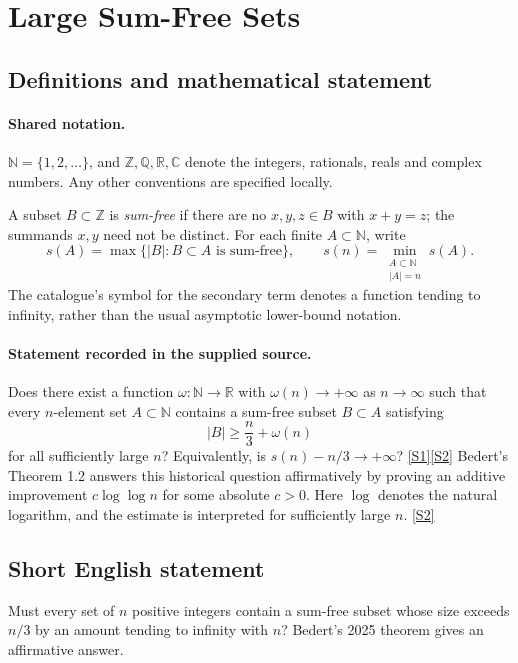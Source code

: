 \documentclass[11pt]{article}
\newcommand{\sref}[2]{\hyperlink{source:#1:#2}{[S#2]}}
\begin{document}
\section{Large Sum-Free Sets}\label{statement}

\subsection{Definitions and mathematical statement}

\paragraph{Shared notation.}$\mathbb N=\{1,2,\ldots\}$, and $\mathbb Z,\mathbb Q,\mathbb R,\mathbb C$ denote the integers, rationals, reals and complex numbers. Any other conventions are specified locally.


A subset $B\subset\mathbb Z$ is \emph{sum-free} if there are no $x,y,z\in B$ with $x+y=z$; the summands $x,y$ need not be distinct. For each finite $A\subset\mathbb N$, write
\[
s(A)=\max\{|B|:B\subset A\text{ is sum-free}\},\qquad
s(n)=\min_{\substack{A\subset\mathbb N\\|A|=n}}s(A).
\]
The catalogue's symbol for the secondary term denotes a function tending to infinity, rather than the usual asymptotic lower-bound notation.
\paragraph{Statement recorded in the supplied source.}
Does there exist a function $\omega:\mathbb N\to\mathbb R$ with $\omega(n)\to+\infty$ as $n\to\infty$ such that every $n$-element set $A\subset\mathbb N$ contains a sum-free subset $B\subset A$ satisfying
\[
|B|\ge \frac n3+\omega(n)
\]
for all sufficiently large $n$? Equivalently, is $s(n)-n/3\to+\infty$? \sref{statement}{1}\sref{statement}{2}
Bedert's Theorem 1.2 answers this historical question affirmatively by proving an additive improvement $c\log\log n$ for some absolute $c>0$. Here $\log$ denotes the natural logarithm, and the estimate is interpreted for sufficiently large $n$. \sref{statement}{2}
\subsection{Short English statement}
Must every set of $n$ positive integers contain a sum-free subset whose size exceeds $n/3$ by an amount tending to infinity with $n$? Bedert's 2025 theorem gives an affirmative answer.
\end{document}
